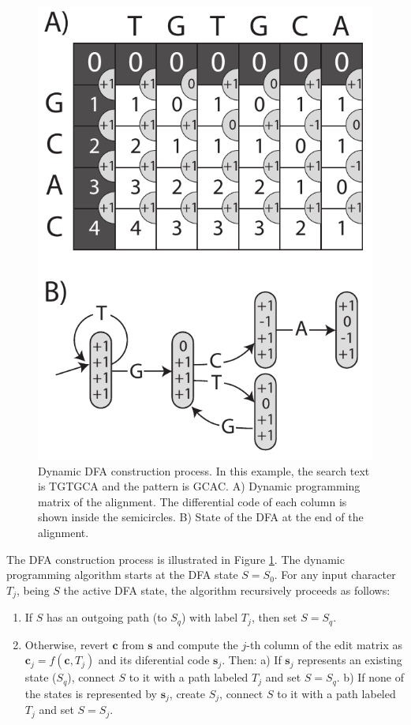 \documentclass{bioinfo}
\begin{document}
\begin{methods}
\begin{figure}[!tpb]
\centerline{\includegraphics[scale=0.6]{Figure_1.pdf}}
\caption{Dynamic DFA construction process. In this example, the search
text is TGTGCA and the pattern is GCAC.
A) Dynamic programming matrix of the alignment. The differential code
of each column is shown inside the semicircles. B) State of the DFA at
the end of the alignment.}\label{matrix}
\end{figure}

The DFA construction process is illustrated in Figure \ref{matrix}. The
dynamic programming algorithm starts at the DFA state
$S = S_0$. For any input character $T_j$, being $S$
the active DFA state, the algorithm recursively proceeds as follows:
\begin{enumerate}
\item If $S$ has an outgoing path (to $S_q$) with
label $T_j$, then set $S = S_q$.
\item Otherwise, revert $\mathbf{c}$ from $\mathbf{s}$ and compute
the $j$-th column of the edit matrix as $\mathbf{c}_j = f(\mathbf{c}, T_j)$ and
its diferential code $\mathbf{s}_j$. Then: a) If $\mathbf{s}_j$
represents an existing state ($S_q$), connect $S$ to it with a path
labeled $T_j$ and set $S = S_q$. b) If none of the states is
represented by $\mathbf{s}_j$, create $S_j$, connect $S$ to it with a
path labeled $T_j$ and set $S = S_j$.
\end{enumerate}


\end{methods}
\end{document}
